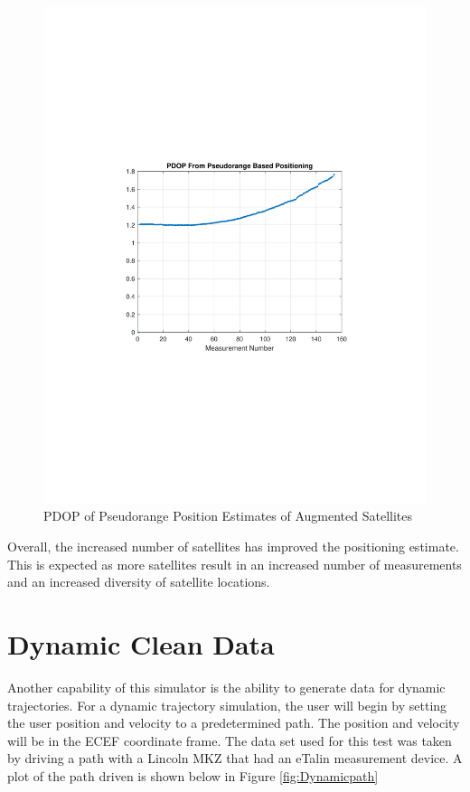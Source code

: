 \documentclass[12pt]{report}
\begin{document}
\begin{figure}[h!]
    \centering
    \includegraphics[trim=1.2in 3.3in 1.75in 3.3in,clip,width=5in]
    {Augment_5min_pseudo_PDOP.pdf}
    \caption{PDOP of Pseudorange Position Estimates of Augmented Satellites}
    \label{fig:AugmentpseudoPDOP}
\end{figure}
Overall, the increased number of satellites has improved the positioning estimate. This is expected as more satellites result in an increased number of measurements and an increased diversity of satellite locations. 

\pagebreak
\section{Dynamic Clean Data}
Another capability of this simulator is the ability to generate data for dynamic trajectories. For a dynamic trajectory simulation, the user will begin by setting the user position and velocity to a predetermined path. The position and velocity will be in the ECEF coordinate frame. The data set used for this test was taken by driving a path with a Lincoln MKZ that had an eTalin measurement device. A plot of the path driven is shown below in Figure \ref{fig:Dynamicpath}
\end{document}
